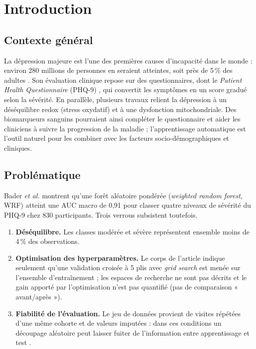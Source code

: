 \section{Introduction}

\subsection{Contexte général}
La dépression majeure est l'une des premières causes d'incapacité dans le monde : environ 280 millions de personnes en seraient atteintes, soit près de 5\,\% des adultes \cite{bader2024,hidaka2012}. Son évaluation clinique repose sur des questionnaires, dont le \emph{Patient Health Questionnaire} (PHQ-9) \cite{kroenke2001}, qui convertit les symptômes en un score gradué selon la sévérité. En parallèle, plusieurs travaux relient la dépression à un déséquilibre redox (stress oxydatif) \cite{black2015} et à une dysfonction mitochondriale. Des biomarqueurs sanguins pourraient ainsi compléter le questionnaire et aider les cliniciens à suivre la progression de la maladie ; l'apprentissage automatique est l'outil naturel pour les combiner avec les facteurs socio-démographiques et cliniques.

\subsection{Problématique}
Bader \emph{et al.} \cite{bader2024} montrent qu'une forêt aléatoire pondérée (\emph{weighted random forest}, WRF) atteint une AUC macro de 0,91 pour classer quatre niveaux de sévérité du PHQ-9 chez 830 participants. Trois verrous subsistent toutefois.
\begin{enumerate}[leftmargin=*,itemsep=0pt,topsep=2pt]
\item \textbf{Déséquilibre.} Les classes modérée et sévère représentent ensemble moins de 4\,\% des observations.
\item \textbf{Optimisation des hyperparamètres.} Le corps de l'article indique seulement qu'une validation croisée à 5 plis avec \emph{grid search} est menée sur l'ensemble d'entraînement ; les espaces de recherche ne sont pas décrits et le gain apporté par l'optimisation n'est pas quantifié (pas de comparaison « avant/après »).
\item \textbf{Fiabilité de l'évaluation.} Le jeu de données provient de visites répétées d'une même cohorte et de valeurs imputées \cite{bader2024,jelinek2014} : dans ces conditions un découpage aléatoire peut laisser fuiter de l'information entre apprentissage et test \cite{kaufman2012}.
\end{enumerate}

